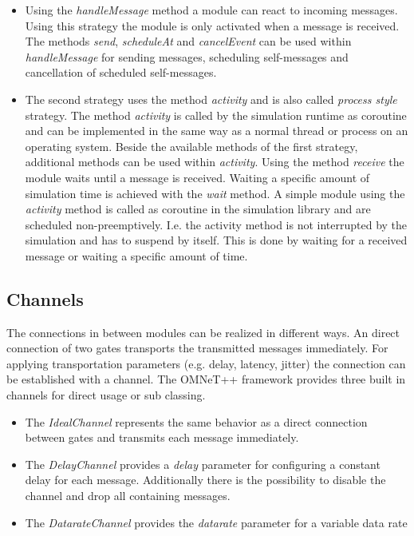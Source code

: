 \begin{itemize}
    \item Using the \emph{handleMessage} method a module can react to incoming messages.
    Using this strategy the module is only activated when a message is received.
    The methods \emph{send}, \emph{scheduleAt} and \emph{cancelEvent} can be used within \emph{handleMessage} for sending messages, scheduling self-messages and cancellation of scheduled self-messages. \cite[section 4.4.1]{omnet_manual}
    
    \item The second strategy uses the method \emph{activity} and is also called \emph{process style} strategy.
    The method \emph{activity} is called by the simulation runtime as coroutine and can be implemented in the same way as a normal thread or process on an operating system.
    Beside the available methods of the first strategy, additional methods can be used within \emph{activity}.
    Using the method \emph{receive} the module waits until a message is received.
    Waiting a specific amount of simulation time is achieved with the \emph{wait} method.
    A simple module using the \emph{activity} method is called as coroutine in the simulation library and are scheduled non-preemptively.
    I.e. the activity method is not interrupted by the simulation and has to suspend by itself.
    This is done by waiting for a received message or waiting a specific amount of time. \cite[section 4.4.2]{omnet_manual}
\end{itemize}

\subsection{Channels}
\label{sec:omnet_components_channels}
The connections in between modules can be realized in different ways.
An direct connection of two gates transports the transmitted messages immediately.
For applying transportation parameters (e.g. delay, latency, jitter) the connection can be established with a channel.
The OMNeT++ framework provides three built in channels for direct usage or sub classing.

\begin{itemize}
    \item The \emph{IdealChannel} represents the same behavior as a direct connection between gates and transmits each message immediately.
    \item The \emph{DelayChannel} provides a \emph{delay} parameter for configuring a constant delay for each message.
    Additionally there is the possibility to disable the channel and drop all containing messages.
    \item The \emph{DatarateChannel} provides the \emph{datarate} parameter for a variable data rate
\end{itemize}

